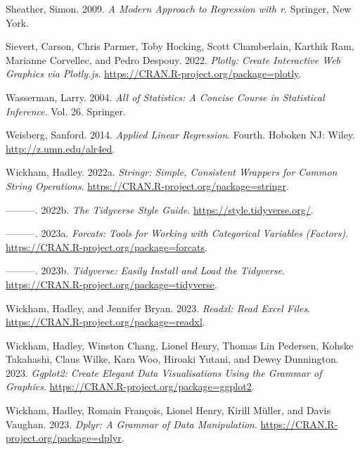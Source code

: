 \documentclass[
]{book}
\newlength{\cslhangindent}
\newlength{\cslentryspacingunit} %
\newenvironment{CSLReferences}[2] %
 {%
  \setlength{\parindent}{0pt}
  \ifodd #1
  \let\oldpar\par
  \def\par{\hangindent=\cslhangindent\oldpar}
  \fi
  \setlength{\parskip}{#2\cslentryspacingunit}
 }%
 {}
\theoremstyle{definition}
\theoremstyle{definition}
\theoremstyle{definition}
\theoremstyle{definition}
\theoremstyle{remark}
\begin{document}
\begin{CSLReferences}{1}{0}
\leavevmode{}%
Sheather, Simon. 2009. \emph{A Modern Approach to Regression with r}. Springer, New York.

\leavevmode{}%
Sievert, Carson, Chris Parmer, Toby Hocking, Scott Chamberlain, Karthik Ram, Marianne Corvellec, and Pedro Despouy. 2022. \emph{Plotly: Create Interactive Web Graphics via Plotly.js}. \url{https://CRAN.R-project.org/package=plotly}.

\leavevmode{}%
Wasserman, Larry. 2004. \emph{All of Statistics: A Concise Course in Statistical Inference}. Vol. 26. Springer.

\leavevmode{}%
Weisberg, Sanford. 2014. \emph{Applied Linear Regression}. Fourth. Hoboken {NJ}: Wiley. \url{http://z.umn.edu/alr4ed}.

\leavevmode{}%
Wickham, Hadley. 2022a. \emph{Stringr: Simple, Consistent Wrappers for Common String Operations}. \url{https://CRAN.R-project.org/package=stringr}.

\leavevmode{}%
---------. 2022b. \emph{The Tidyverse Style Guide}. \url{https://style.tidyverse.org/}.

\leavevmode{}%
---------. 2023a. \emph{Forcats: Tools for Working with Categorical Variables (Factors)}. \url{https://CRAN.R-project.org/package=forcats}.

\leavevmode{}%
---------. 2023b. \emph{Tidyverse: Easily Install and Load the Tidyverse}. \url{https://CRAN.R-project.org/package=tidyverse}.

\leavevmode{}%
Wickham, Hadley, and Jennifer Bryan. 2023. \emph{Readxl: Read Excel Files}. \url{https://CRAN.R-project.org/package=readxl}.

\leavevmode{}%
Wickham, Hadley, Winston Chang, Lionel Henry, Thomas Lin Pedersen, Kohske Takahashi, Claus Wilke, Kara Woo, Hiroaki Yutani, and Dewey Dunnington. 2023. \emph{Ggplot2: Create Elegant Data Visualisations Using the Grammar of Graphics}. \url{https://CRAN.R-project.org/package=ggplot2}.

\leavevmode{}%
Wickham, Hadley, Romain François, Lionel Henry, Kirill Müller, and Davis Vaughan. 2023. \emph{Dplyr: A Grammar of Data Manipulation}. \url{https://CRAN.R-project.org/package=dplyr}.


\end{CSLReferences}
\end{document}
